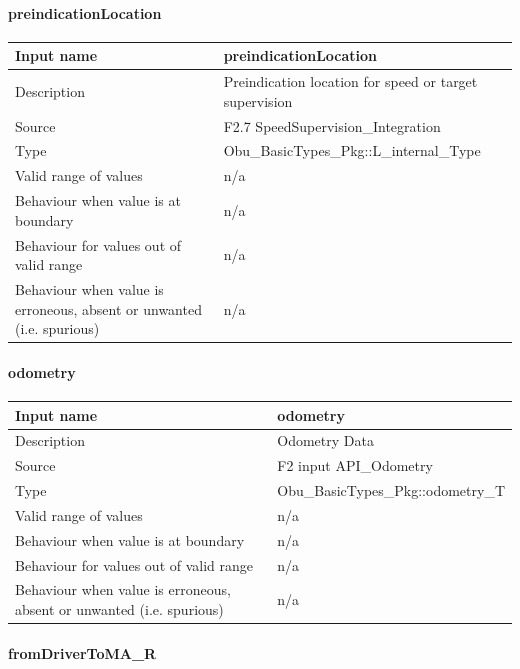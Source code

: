 \paragraph{preindicationLocation}

\begin{longtable}{p{}p{}}
\toprule
Input name				& preindicationLocation\\
\midrule
Description				& Preindication location for speed or target supervision \\
\midrule
Source					& F2.7 SpeedSupervision\_Integration \\ 
\midrule
Type					& Obu\_BasicTypes\_Pkg::L\_internal\_Type\\
\midrule
Valid range of values	& n/a \\
\midrule
Behaviour when value is at boundary	& n/a\\
\midrule
Behaviour for values out of valid range	& n/a\\
\midrule
Behaviour when value is erroneous, absent or unwanted (i.e. spurious) & n/a\\

\bottomrule


\end{longtable}

\paragraph{odometry}

\begin{longtable}{p{}p{}}
\toprule
Input name				& odometry\\
\midrule
Description				& Odometry Data  \\
\midrule
Source					& F2 input API\_Odometry \\ 
\midrule
Type					& Obu\_BasicTypes\_Pkg::odometry\_T\\
\midrule
Valid range of values	& n/a \\
\midrule
Behaviour when value is at boundary	& n/a\\
\midrule
Behaviour for values out of valid range	& n/a\\
\midrule
Behaviour when value is erroneous, absent or unwanted (i.e. spurious) & n/a\\

\bottomrule


\end{longtable}

\paragraph{fromDriverToMA\_R}

